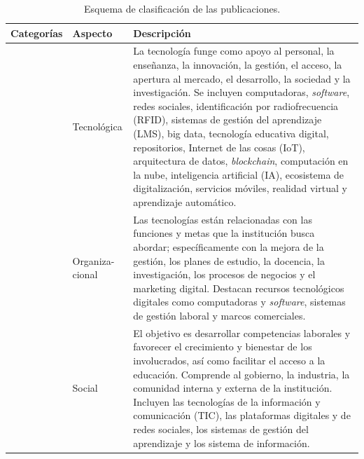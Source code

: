     \begin{longtable}{
    >{\raggedright\arraybackslash}p{}
    >{\raggedright\arraybackslash}p{} 
    >{\raggedright\arraybackslash}p{}}
    	\caption{Esquema de clasificación de las publicaciones.}
    	\label{tab-05}\\
        \toprule
        Categorías & Aspecto & Descripción \\
        \midrule
        \endhead
        \multirow{3}{=}{Perspectiva temática
            (con base en \textcite{bikse2021} y \textcite{benavides2020-castro})} & Tecnológica & La tecnología funge como apoyo al
        personal, la enseñanza, la innovación, la gestión, el acceso, la
        apertura al mercado, el desarrollo, la sociedad y la investigación. Se
        incluyen computadoras, \emph{software}, redes sociales, identificación
        por radiofrecuencia (RFID), sistemas de gestión del aprendizaje (LMS),
        big data, tecnología educativa digital, repositorios, Internet de las
        cosas (IoT), arquitectura de datos, \emph{blockchain}, computación en la
        nube, inteligencia artificial (IA), ecosistema de digitalización,
        servicios móviles, realidad virtual y aprendizaje automático. \\
        & Organiza-cional & Las tecnologías están relacionadas con las funciones
        y metas que la institución busca abordar; específicamente con la mejora
        de la gestión, los planes de estudio, la docencia, la investigación, los
        procesos de negocios y el marketing digital. Destacan recursos
        tecnológicos digitales como computadoras y \emph{software}, sistemas de
        gestión laboral y marcos comerciales. \\
        & Social & El objetivo es desarrollar competencias laborales y favorecer
        el crecimiento y bienestar de los involucrados, así como facilitar el
        acceso a la educación. Comprende al gobierno, la industria, la comunidad
        interna y externa de la institución. Incluyen las tecnologías de la
        información y comunicación (TIC), las plataformas digitales y de redes
        sociales, los sistemas de gestión del aprendizaje y los sistema de
        información. \\
        

\end{longtable}
